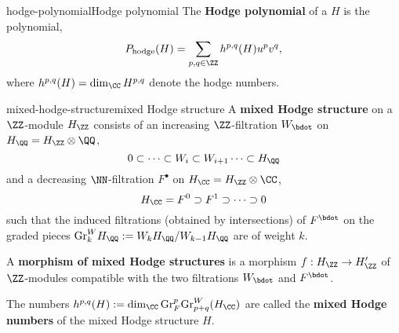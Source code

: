\begin{topic}{hodge-polynomial}{Hodge polynomial}
    The \textbf{Hodge polynomial} of a  $H$ is the polynomial,
    \[ P_\text{hodge}(H) = \sum_{p, q \in \ZZ} h^{p, q}(H) u^p v^q , \]
    where $h^{p, q}(H) = \dim_\CC H^{p, q}$ denote the hodge numbers.
\end{topic}

\begin{topic}{mixed-hodge-structure}{mixed Hodge structure}
    A \textbf{mixed Hodge structure} on a $\ZZ$-module $H_\ZZ$ consists of an increasing $\ZZ$-filtration $W_\bdot$ on $H_\QQ = H_\ZZ \otimes \QQ$,
    \[ 0 \subset \cdots \subset W_i \subset W_{i + 1} \cdots \subset H_\QQ \]
    and a decreasing $\NN$-filtration $F^\bullet$ on $H_\CC = H_\ZZ \otimes \CC$,
    \[ H_\CC = F^0 \supset F^1 \supset \cdots \supset 0 \]
    such that the induced filtrations (obtained by intersections) of $F^\bdot$ on the graded pieces $\text{Gr}^W_k H_\QQ := W_k H_\QQ / W_{k - 1} H_\QQ$ are  of weight $k$.
    
    A \textbf{morphism of mixed Hodge structures} is a morphism $f : H_\ZZ \to H'_\ZZ$ of $\ZZ$-modules compatible with the two filtrations $W_\bdot$ and $F^\bdot$.
    
    The numbers $h^{p, q}(H) := \dim_\CC \textup{Gr}_F^p \textup{Gr}^W_{p + q}(H_\CC)$ are called the \textbf{mixed Hodge numbers} of the mixed Hodge structure $H$.
\end{topic}
